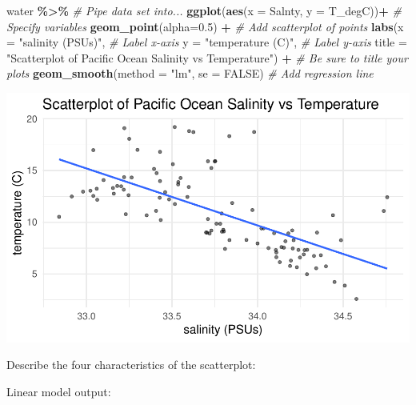 \documentclass[
]{report}
\newenvironment{Shaded}{\begin{snugshade}}{\end{snugshade}}
\newcommand{\AttributeTok}[1]{\textcolor[rgb]{0.13,0.29,0.53}{#1}}
\newcommand{\CommentTok}[1]{\textcolor[rgb]{0.56,0.35,0.01}{\textit{#1}}}
\newcommand{\ConstantTok}[1]{\textcolor[rgb]{0.56,0.35,0.01}{#1}}
\newcommand{\DecValTok}[1]{\textcolor[rgb]{0.00,0.00,0.81}{#1}}
\newcommand{\FloatTok}[1]{\textcolor[rgb]{0.00,0.00,0.81}{#1}}
\newcommand{\FunctionTok}[1]{\textcolor[rgb]{0.13,0.29,0.53}{\textbf{#1}}}
\newcommand{\NormalTok}[1]{#1}
\newcommand{\OtherTok}[1]{\textcolor[rgb]{0.56,0.35,0.01}{#1}}
\newcommand{\SpecialCharTok}[1]{\textcolor[rgb]{0.81,0.36,0.00}{\textbf{#1}}}
\newcommand{\StringTok}[1]{\textcolor[rgb]{0.31,0.60,0.02}{#1}}
\begin{document}
\vspace{0.2in}

\begin{Shaded}
\begin{Highlighting}[]
\NormalTok{water }\SpecialCharTok{\%\textgreater{}\%} \CommentTok{\# Pipe data set into...}
\FunctionTok{ggplot}\NormalTok{(}\FunctionTok{aes}\NormalTok{(}\AttributeTok{x =}\NormalTok{ Salnty, }\AttributeTok{y =}\NormalTok{ T\_degC))}\SpecialCharTok{+}  \CommentTok{\# Specify variables}
  \FunctionTok{geom\_point}\NormalTok{(}\AttributeTok{alpha=}\FloatTok{0.5}\NormalTok{) }\SpecialCharTok{+}  \CommentTok{\# Add scatterplot of points}
  \FunctionTok{labs}\NormalTok{(}\AttributeTok{x =} \StringTok{"salinity (PSUs)"}\NormalTok{,  }\CommentTok{\# Label x{-}axis}
       \AttributeTok{y =} \StringTok{"temperature (C)"}\NormalTok{,  }\CommentTok{\# Label y{-}axis}
       \AttributeTok{title =} \StringTok{"Scatterplot of Pacific Ocean Salinity vs Temperature"}\NormalTok{) }\SpecialCharTok{+}
               \CommentTok{\# Be sure to title your plots}
  \FunctionTok{geom\_smooth}\NormalTok{(}\AttributeTok{method =} \StringTok{"lm"}\NormalTok{, }\AttributeTok{se =} \ConstantTok{FALSE}\NormalTok{)  }\CommentTok{\# Add regression line}
\end{Highlighting}
\end{Shaded}

\begin{center}\includegraphics[width=0.7\linewidth]{13-VN13-regression_files/figure-latex/unnamed-chunk-10-1} \end{center}

Describe the four characteristics of the scatterplot:

\vspace{1in}

Linear model output:

\begin{Shaded}
\end{Shaded}
\end{document}
